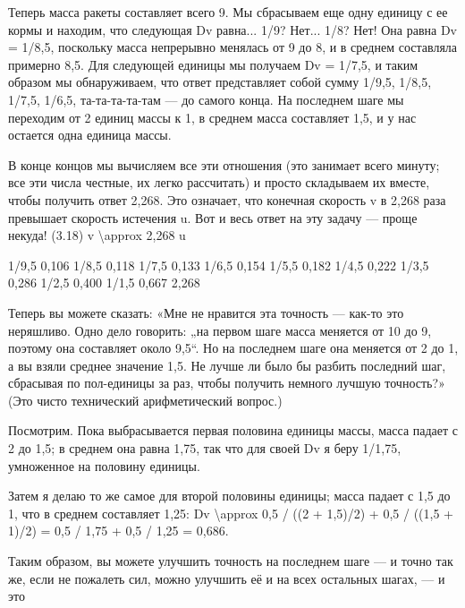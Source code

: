\documentclass[10pt,oneside]{article}
\newcommand{\TipsRunning}[1]{\par\vspace{2bp}{\centering\footnotesize #1\par}\vspace{2bp}}
\begin{document}
\TipsRunning{З А Д А Ч И  И  Р Е Ш Е Н И Я • 1 0 3}

Теперь масса ракеты составляет всего 9. Мы сбрасываем еще одну единицу с ее кормы и находим, что следующая Dv равна... 1/9? Нет... 1/8? Нет! Она равна Dv = 1/8,5, поскольку масса непрерывно менялась от 9 до 8, и в среднем составляла примерно 8,5. Для следующей единицы мы получаем Dv = 1/7,5, и таким образом мы обнаруживаем, что ответ представляет собой сумму 1/9,5, 1/8,5, 1/7,5, 1/6,5, та-та-та-та-там --- до самого конца. На последнем шаге мы переходим от 2 единиц массы к 1, в среднем масса составляет 1,5, и у нас остается одна единица массы.\par

В конце концов мы вычисляем все эти отношения (это занимает всего минуту; все эти числа честные, их легко рассчитать) и просто складываем их вместе, чтобы получить ответ 2,268. Это означает, что конечная скорость v в 2,268 раза превышает скорость истечения u. Вот и весь ответ на эту задачу --- проще некуда! (3.18) v \textbackslash{}approx 2,268 u\par

1/9,5   0,106 1/8,5   0,118 1/7,5   0,133 1/6,5   0,154 1/5,5   0,182 1/4,5   0,222 1/3,5   0,286 1/2,5   0,400 1/1,5   0,667 2,268\par

Теперь вы можете сказать: «Мне не нравится эта точность --- как-то это неряшливо. Одно дело говорить: „на первом шаге масса меняется от 10 до 9, поэтому она составляет около 9,5“. Но на последнем шаге она меняется от 2 до 1, а вы взяли среднее значение 1,5. Не лучше ли было бы разбить последний шаг, сбрасывая по пол-единицы за раз, чтобы получить немного лучшую точность?» (Это чисто технический арифметический вопрос.)\par

Посмотрим. Пока выбрасывается первая половина единицы массы, масса падает с 2 до 1,5; в среднем она равна 1,75, так что для своей Dv я беру 1/1,75, умноженное на половину единицы.\par

Затем я делаю то же самое для второй половины единицы; масса падает с 1,5 до 1, что в среднем составляет 1,25: Dv \textbackslash{}approx 0,5 / ((2 + 1,5)/2) + 0,5 / ((1,5 + 1)/2) = 0,5 / 1,75 + 0,5 / 1,25 = 0,686.\par

Таким образом, вы можете улучшить точность на последнем шаге --- и точно так же, если не пожалеть сил, можно улучшить её и на всех остальных шагах, --- и это\par
\end{document}
